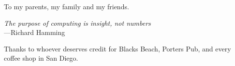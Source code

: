 %
\begin{frontmatter}

%
%
\makefrontmatter 

%
%   
%
%
%
%
\begin{dedication} 
	To my parents, my family and my friends.
\end{dedication}

%   
%



%
%

\begin{epigraph} 
  \emph{The purpose of computing is insight, not numbers}\\
  ---Richard Hamming
\end{epigraph}

%
\tableofcontents
\listoffigures  %
\listoftables   %

\printglossary[title=List of Abbreviations,toctitle=List of Abbreviations,nonumberlist ]

%
%
\begin{acknowledgements} 
 Thanks to whoever deserves credit for Blacks Beach, Porters Pub, and
 every coffee shop in San Diego. 


\end{acknowledgements}
\end{frontmatter}
